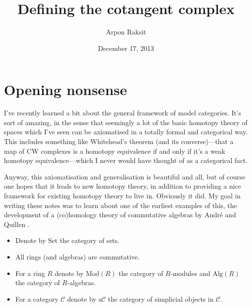 

\title{Defining the cotangent complex}
\author{Arpon Raksit}
\date{December 17, 2013}


\maketitle
\thispagestyle{fancy}


\newcommand{\s}{\mathrm{s}}
\newcommand{\Top}{\mathrm{Top}}
\newcommand{\Set}{\mathrm{Set}}
\newcommand{\Alg}{\mathrm{Alg}}
\newcommand{\Mod}{\mathrm{Mod}}
\newcommand{\Ab}{\mathrm{Ab}}
\newcommand{\Sing}{\operatorname{Sing}}


\section*{Opening nonsense}

I've recently learned a bit about the general framework of model
categories. It's sort of amazing, in the sense that seemingly a lot of
the basic homotopy theory of spaces which I've seen can be axiomatised
in a totally formal and categorical way. This includes something like
Whitehead's theorem (and its converse)---that a map of CW complexes is
a homotopy equivalence if and only if it's a weak homotopy
equivalence---which I never would have thought of as a categorical
fact.

Anyway, this axiomatisation and generalisation is beautiful and all,
but of course one hopes that it leads to new homotopy theory, in
addition to providing a nice framework for existing homotopy theory to
live in. Obviously it did. My goal in writing these notes was to learn
about one of the earliest examples of this, the development of a
(co)homology theory of commutative algebras by Andr\'{e}
\cite{andre-cotangent} and Quillen \cite{quillen-cotangent}.

\renewcommand{\C}{\mathcal{C}}

\begin{notation*}
  \begin{itemize}[leftmargin=*]
  \item Denote by $\Set$ the category of sets.
  \item All rings (and algebras) are commutative.
  \item For a ring $R$ denote by $\Mod(R)$ the category of $R$-modules
    and $\Alg(R)$ the category of $R$-algebras.
  \item For a category $\C$ denote by $\s\C$ the category of
    simplicial objects in $\C$.
  \end{itemize}
\end{notation*}

